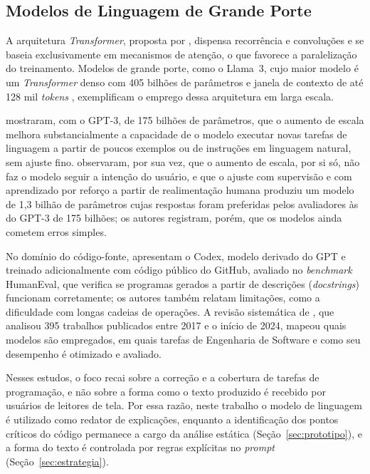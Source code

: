 \documentclass[
    12pt,                   %
    openright,              %
    oneside,                %
    a4paper,                %
    sumario=tradicional,    %
    english,                %
    brazil,                 %
    ]{abntex2}
\begin{document}
\subsection{Modelos de Linguagem de Grande Porte}\label{sec:LLM}

A arquitetura \textit{Transformer}, proposta por \textcite{vaswani2017attention}, dispensa recorrência e convoluções e se baseia exclusivamente em mecanismos de atenção, o que favorece a paralelização do treinamento. Modelos de grande porte, como o Llama~3, cujo maior modelo é um \textit{Transformer} denso com 405 bilhões de parâmetros e janela de contexto de até 128 mil \textit{tokens} \cite{grattafiori2024llama3}, exemplificam o emprego dessa arquitetura em larga escala.

\textcite{brown2020fewshot} mostraram, com o GPT-3, de 175 bilhões de parâmetros, que o aumento de escala melhora substancialmente a capacidade de o modelo executar novas tarefas de linguagem a partir de poucos exemplos ou de instruções em linguagem natural, sem ajuste fino. \textcite{ouyang2022instructions} observaram, por sua vez, que o aumento de escala, por si só, não faz o modelo seguir a intenção do usuário, e que o ajuste com supervisão e com aprendizado por reforço a partir de realimentação humana produziu um modelo de 1,3 bilhão de parâmetros cujas respostas foram preferidas pelos avaliadores às do GPT-3 de 175 bilhões; os autores registram, porém, que os modelos ainda cometem erros simples.

No domínio do código-fonte, \textcite{chen2021codex} apresentam o Codex, modelo derivado do GPT e treinado adicionalmente com código público do GitHub, avaliado no \textit{benchmark} HumanEval, que verifica se programas gerados a partir de descrições (\textit{docstrings}) funcionam corretamente; os autores também relatam limitações, como a dificuldade com longas cadeias de operações. A revisão sistemática de \textcite{hou2024llmse}, que analisou 395 trabalhos publicados entre 2017 e o início de 2024, mapeou quais modelos são empregados, em quais tarefas de Engenharia de Software e como seu desempenho é otimizado e avaliado.

Nesses estudos, o foco recai sobre a correção e a cobertura de tarefas de programação, e não sobre a forma como o texto produzido é recebido por usuários de leitores de tela. Por essa razão, neste trabalho o modelo de linguagem é utilizado como redator de explicações, enquanto a identificação dos pontos críticos do código permanece a cargo da análise estática (Seção~\ref{sec:prototipo}), e a forma do texto é controlada por regras explícitas no \textit{prompt} (Seção~\ref{sec:estrategia}).
\end{document}
